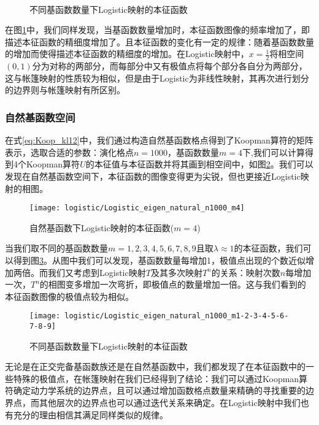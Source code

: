 \begin{figure}[!]
  \centering
    \\
  \caption{不同基函数数量下Logistic映射的本征函数}\label{fig:logi_eig_RGFL_multim}
\end{figure}

在图\ref{fig:logi_eig_RGFL_multim}中，我们同样发现，当基函数数量增加时，本征函数图像的频率增加了，即描述本征函数的精细度增加了。且本征函数的变化有一定的规律：随着基函数数量的增加而使得描述本征函数的精细度的增加。在Logistic映射中，$x=\frac{1}{2}$将相空间$(0,1)$分为对称的两部分，而每部分中又有极值点将每个部分各自分为两部分，这与帐篷映射的性质较为相似，但是由于Logistic为非线性映射，其再次进行划分的边界则与帐篷映射有所区别。

\subsubsection{自然基函数空间}
在式\eqref{eq:Koop_kl12}中，我们通过构造自然基函数格点得到了Koopman算符的矩阵表示，选取合适的参数：演化格点$n=1000$，基函数数量$m=4$下,我们可以计算得到4个Koopman算符$U$的本征值与本征函数并将其画到相空间中，如图\ref{fig:Logistic_eigen_natural_n1000_m4}。我们可以发现在自然基函数空间下，本征函数的图像变得更为尖锐，但也更接近Logistic映射的相图。
\begin{figure}[!]
	\centering
	\texttt{[image: logistic/Logistic\_eigen\_natural\_n1000\_m4]}
    \caption{自然基函数下Logistic映射的本征函数($m=4$)}\label{fig:Logistic_eigen_natural_n1000_m4}
\end{figure}
当我们取不同的基函数数量$m=1,2,3,4,5,6,7,8,9$且取$\lambda\approx 1$的本征函数，我们可以得到图\ref{Logistic_eigen_natural_n5000_m1-2-3-4-5-6-7-8-9}。从图中我们可以发现，基函数数量每增加1，极值点出现的个数近似增加两倍。而我们又考虑到Logistic映射$T$及其多次映射$T^n$的关系：映射次数$n$每增加一次，$T^n$的相图变多增加一次弯折，即极值点的数量增加一倍。这与我们看到的本征函数图像的极值点较为相似。
\begin{figure}[!]
	\centering
	\texttt{[image: logistic/Logistic\_eigen\_natural\_n1000\_m1-2-3-4-5-6-7-8-9]}
    \caption{不同基函数数量下Logistic映射的本征函数}\label{Logistic_eigen_natural_n5000_m1-2-3-4-5-6-7-8-9}
\end{figure}
无论是在正交完备基函数族还是在自然基函数中，我们都发现了在本征函数中的一些特殊的极值点，在帐篷映射在我们已经得到了结论：我们可以通过Koopman算符确定动力学系统的边界点，且可以通过增加函数格点数量来精确的寻找重要的边界点，而其他层次的边界点也可以通过迭代关系来确定。在Logistic映射中我们也有充分的理由相信其满足同样类似的规律。

